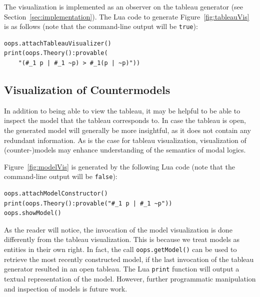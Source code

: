 The visualization is implemented as an observer on the tableau generator
(see Section~\ref{sec:implementation}).
The Lua code to generate
Figure~\ref{fig:tableauVis} is as follows (note that the command-line output
will be \lstinline!true!):
\begin{lstlisting}
oops.attachTableauVisualizer()
print(oops.Theory():provable(
	"(#_1 p | #_1 ~p) > #_1(p | ~p)"))
\end{lstlisting}

\subsection{Visualization of Countermodels}

In addition to being able to view the tableau, it may be helpful to be able to
inspect the model that the tableau corresponds to.
In case the tableau is open, the generated model will generally be more
insightful, as it does not contain any redundant information.
As is the case for tableau visualization, visualization of (counter-)models may
enhance understanding of the semantics of modal logics.



Figure~\ref{fig:modelVis} is generated by the following Lua code (note that
the command-line output will be \lstinline!false!):
\begin{lstlisting}
oops.attachModelConstructor()
print(oops.Theory():provable("#_1 p | #_1 ~p"))
oops.showModel() 
\end{lstlisting}
As the reader will notice, the invocation of the model visualization is done
differently from the tableau visualization.
This is because we treat models as entities in their own right.
In fact, the call \lstinline!oops.getModel()!  can be used to retrieve the most
recently constructed model, if the last invocation of the tableau generator
resulted in an open tableau.
The Lua \lstinline!print! function will output a textual representation of the
model.
However, further programmatic manipulation and inspection of models is future
work.
